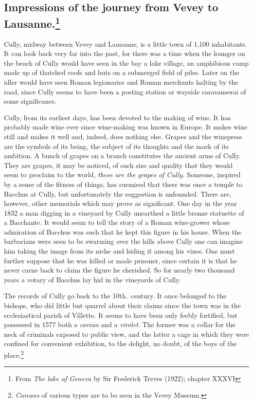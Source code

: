 \documentclass[11pt,a4paper,twocolumn]{article}
\begin{document}
\heading

\subsection*{Impressions of the journey from \mbox{Vevey} to Lausanne.\footnote{From
\emph{The lake of Geneva} by Sir Frederick Treves (1922); chapter XXXVI}}

Cully, midway between Vevey and Lausanne, is a little town of 1,100
inhabitants. It can look back very far into the past, for there was a time
when the lounger on the beach of Cully would have seen in the bay a lake
village, an amphibious camp made up of thatched roofs and huts on a submerged
field of piles. Later on the idler would have seen Roman legionaries and
Roman merchants halting by the road, since Cully seems to have been a posting
station or wayside caravanserai of some significance.

Cully, from its earliest days, has been devoted to the making of wine. It has
probably made wine ever since wine-making was known in Europe. It makes wine
still and makes it well and, indeed, does nothing else. Grapes and the
winepress are the symbols of its being, the subject of its thoughts and the
mark of its ambition. A bunch of grapes on a branch constitutes the ancient
arms of Cully. They are grapes, it may be noticed, of such size and quality
that they would seem to proclaim to the world, \emph{these are the grapes of
Cully.}  Someone, inspired by a sense of the fitness of things, has surmised
that there was once a temple to Bacchus at Cully, but unfortunately the
suggestion is unfounded. There are, however, other memorials which may prove
as significant. One day in the year 1832 a man digging in a vineyard by Cully
unearthed a little bronze statuette of a Bacchante. It would seem to tell the
story of a Roman wine-grower whose admiration of Bacchus was such that he
kept this figure in his house. When the barbarians were seen to be swarming
over the hills above Cully one can imagine him taking the image from its
niche and hiding it among his vines. One must further suppose that he was
killed or made prisoner, since certain it is that he never carne back to
claim the figure he cherished. So for nearly two thousand years a votary of
Bacchus lay hid in the vineyards of Cully.

The records of Cully go back to the 10th.\ century. It once belonged to the
bishops, who did little but quarrel about their claims since the town was in
the ecclesiastical parish of Villette. It seems to have been only feebly
fortified, but possessed in 1577 both a \emph{carcan} and a \emph{virolet}\@.
The former was a collar for the neck of criminals exposed to public view, and
the latter a cage in which they were confined for convenient exhibition, to
the delight, no doubt, of the boys of the place.\footnote{\emph{Carcans} of
various types are to be seen in the Vevey Museum.}
\end{document}
